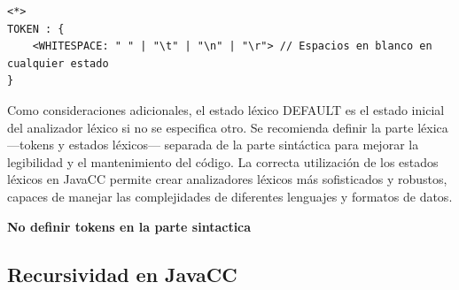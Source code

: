 \lstset{inputencoding=utf8/latin1}
\begin{lstlisting}
<*>
TOKEN : {
	<WHITESPACE: " " | "\t" | "\n" | "\r"> // Espacios en blanco en cualquier estado
}
\end{lstlisting}

Como consideraciones adicionales, el estado léxico DEFAULT es el estado inicial del analizador léxico si no se especifica otro.
Se recomienda definir la parte léxica ---tokens y estados léxicos--- separada de la parte sintáctica para mejorar la legibilidad y el mantenimiento del código.
La correcta utilización de los estados léxicos en JavaCC permite crear analizadores léxicos más sofisticados y robustos, capaces de manejar las complejidades de diferentes lenguajes y formatos de datos.

\textbf{No definir tokens en la parte sintactica}

\subsection{Recursividad en JavaCC}







